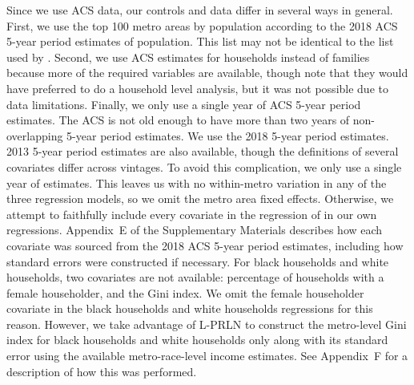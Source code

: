 \documentclass[12pt]{article}
\begin{document}
Since we use ACS data, our controls and data differ in several ways in general. First, we use the top 100 metro areas by population according to the 2018 ACS 5-year period estimates of population. This list may not be identical to the list used by \citet{reardon2011income}. Second, we use ACS estimates for households instead of families because more of the required variables are available, though \citet{reardon2011income} note that they would have preferred to do a household level analysis, but it was not possible due to data limitations. Finally, we only use a single year of ACS 5-year period estimates. The ACS is not old enough to have more than two years of non-overlapping 5-year period estimates. We use the 2018 5-year period estimates. 2013 5-year period estimates are also available, though the definitions of several covariates differ across vintages. To avoid this complication, we only use a single year of estimates. This leaves us with no within-metro variation in any of the three regression models, so we omit the metro area fixed effects. Otherwise, we attempt to faithfully include every covariate in the regression of \citet{reardon2011income} in our own regressions. Appendix~E %
 of the Supplementary Materials describes how each covariate was sourced from the 2018 ACS 5-year period estimates, including how standard errors were constructed if necessary. For black households and white households, two covariates are not available: percentage of households with a female householder, and the Gini index. We omit the female householder covariate in the black households and white households regressions for this reason. However, we take advantage of L-PRLN to construct the metro-level Gini index for black households and white households only along with its standard error using the available metro-race-level income estimates. See Appendix~F %
 for a description of how this was performed. 
\end{document}
